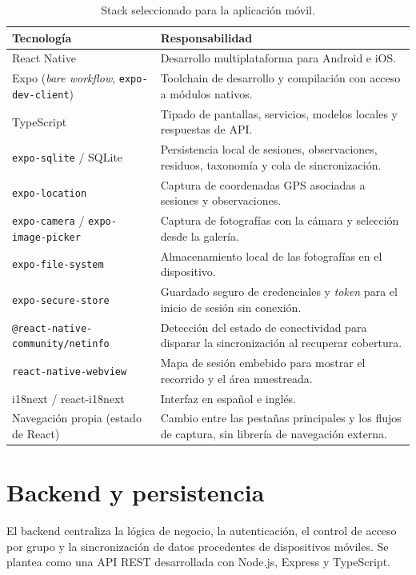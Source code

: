 \begin{table}[H]
  \centering
  \caption{Stack seleccionado para la aplicación móvil.}
  \label{tab:stack_mobile}
  \begin{tabularx}{\textwidth}{lX}
    \toprule
    \textbf{Tecnología} & \textbf{Responsabilidad} \\
    \midrule
    React Native & Desarrollo multiplataforma para Android e iOS. \\
    Expo (\textit{bare workflow}, \texttt{expo-dev-client}) & Toolchain de desarrollo y compilación con acceso a módulos nativos. \\
    TypeScript & Tipado de pantallas, servicios, modelos locales y respuestas de API. \\
    \texttt{expo-sqlite} / SQLite & Persistencia local de sesiones, observaciones, residuos, taxonomía y cola de sincronización. \\
    \texttt{expo-location} & Captura de coordenadas GPS asociadas a sesiones y observaciones. \\
    \texttt{expo-camera} / \texttt{expo-image-picker} & Captura de fotografías con la cámara y selección desde la galería. \\
    \texttt{expo-file-system} & Almacenamiento local de las fotografías en el dispositivo. \\
    \texttt{expo-secure-store} & Guardado seguro de credenciales y \textit{token} para el inicio de sesión sin conexión. \\
    \texttt{@react-native-community/netinfo} & Detección del estado de conectividad para disparar la sincronización al recuperar cobertura. \\
    \texttt{react-native-webview} & Mapa de sesión embebido para mostrar el recorrido y el área muestreada. \\
    i18next / react-i18next & Interfaz en español e inglés. \\
    Navegación propia (estado de React) & Cambio entre las pestañas principales y los flujos de captura, sin librería de navegación externa. \\
    \bottomrule
  \end{tabularx}
\end{table}

\section{Backend y persistencia}

El backend centraliza la lógica de negocio, la autenticación, el control de acceso
por grupo y la sincronización de datos procedentes de dispositivos móviles. Se
plantea como una API REST desarrollada con Node.js, Express y TypeScript.

